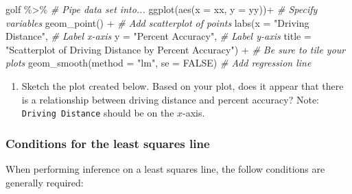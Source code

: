 \documentclass[
]{report}
\newenvironment{Shaded}{\begin{snugshade}}{\end{snugshade}}
\newcommand{\AttributeTok}[1]{\textcolor[rgb]{0.77,0.63,0.00}{#1}}
\newcommand{\CommentTok}[1]{\textcolor[rgb]{0.56,0.35,0.01}{\textit{#1}}}
\newcommand{\ConstantTok}[1]{\textcolor[rgb]{0.00,0.00,0.00}{#1}}
\newcommand{\FunctionTok}[1]{\textcolor[rgb]{0.00,0.00,0.00}{#1}}
\newcommand{\NormalTok}[1]{#1}
\newcommand{\SpecialCharTok}[1]{\textcolor[rgb]{0.00,0.00,0.00}{#1}}
\newcommand{\StringTok}[1]{\textcolor[rgb]{0.31,0.60,0.02}{#1}}
\providecommand{\tightlist}{%
  \setlength{\itemsep}{0pt}\setlength{\parskip}{0pt}}
\begin{document}
\begin{Shaded}
\begin{Highlighting}[]
\NormalTok{golf }\SpecialCharTok{\%\textgreater{}\%} \CommentTok{\# Pipe data set into...}
\FunctionTok{ggplot}\NormalTok{(}\FunctionTok{aes}\NormalTok{(}\AttributeTok{x =}\NormalTok{ xx, }\AttributeTok{y =}\NormalTok{ yy))}\SpecialCharTok{+}  \CommentTok{\# Specify variables}
  \FunctionTok{geom\_point}\NormalTok{() }\SpecialCharTok{+}  \CommentTok{\# Add scatterplot of points}
  \FunctionTok{labs}\NormalTok{(}\AttributeTok{x =} \StringTok{"Driving Distance"}\NormalTok{,  }\CommentTok{\# Label x{-}axis}
       \AttributeTok{y =} \StringTok{"Percent Accuracy"}\NormalTok{,  }\CommentTok{\# Label y{-}axis}
       \AttributeTok{title =} \StringTok{"Scatterplot of Driving Distance by Percent Accuracy"}\NormalTok{) }\SpecialCharTok{+} 
               \CommentTok{\# Be sure to tile your plots}
  \FunctionTok{geom\_smooth}\NormalTok{(}\AttributeTok{method =} \StringTok{"lm"}\NormalTok{, }\AttributeTok{se =} \ConstantTok{FALSE}\NormalTok{)  }\CommentTok{\# Add regression line}
\end{Highlighting}
\end{Shaded}

\begin{enumerate}
\def\labelenumi{\arabic{enumi}.}
\tightlist
\item
  Sketch the plot created below. Based on your plot, does it appear that there is a relationship between driving distance and percent accuracy? Note: \texttt{Driving\ Distance} should be on the \(x\)-axis.
\end{enumerate}

\vspace{2in}

\hypertarget{conditions-for-the-least-squares-line}{%
\subsubsection*{Conditions for the least squares line}\label{conditions-for-the-least-squares-line}}

When performing inference on a least squares line, the follow conditions are generally required:
\end{document}
